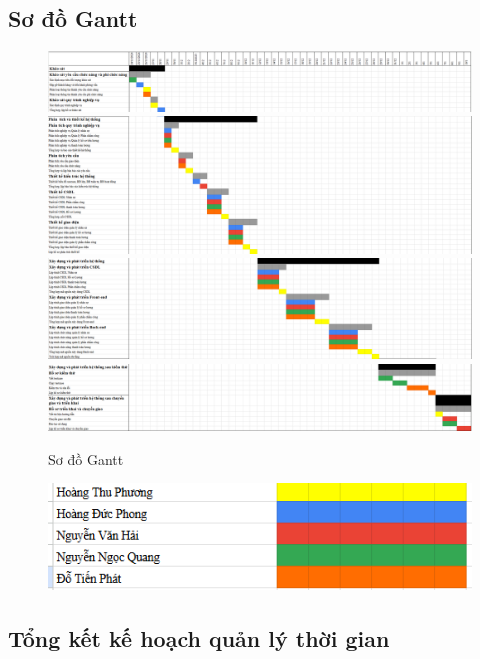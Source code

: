\subsection{Sơ đồ Gantt}
\begin{figure}[H]
    \centering
    \includegraphics[width=\textwidth]{images/gantt1.png}
    \includegraphics[width=\textwidth]{images/gantt2.png}
    \includegraphics[width=\textwidth]{images/gantt3.png}
    \includegraphics[width=\textwidth]{images/gantt4.png}
    \caption{Sơ đồ Gantt}
\end{figure}
\begin{figure}[H]
    \centering
    \includegraphics[width=\textwidth]{images/gantt_tv.png}
\end{figure}
\subsection{Tổng kết kế hoạch quản lý thời gian}
